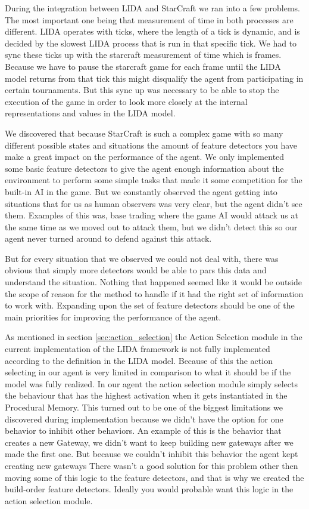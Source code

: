 During the integration between LIDA and StarCraft we ran into a few problems. The most important one being that measurement of time in both processes are different. LIDA operates with ticks, where the length of a tick is dynamic, and is decided by the slowest LIDA process that is run in that specific tick. We had to sync these ticks up with the starcraft measurement  of time which is frames. Because we have to pause the starcraft game for each frame until the LIDA model returns from that tick this might disqualify the agent from participating in certain tournaments. But this sync up was necessary to be able to stop the execution of the game in order to look more closely at the internal representations and values in the LIDA model.

We discovered that because StarCraft is such a complex game with so many different possible states and situations the amount of feature detectors you have make a great impact on the performance of the agent. We only implemented some basic feature detectors to give the agent enough information about the environment to perform some simple tasks that made it some competition for the built-in AI in the game. But we constantly observed the agent getting into situations that for us as human observers was very clear, but the agent didn't see them. Examples of this was, base trading where the game AI would attack us at the same time as we moved out to attack them, but we didn't detect this so our agent never turned around to defend against this attack.

But for every situation that we observed we could not deal with, there was obvious that simply more detectors would be able to pars this data and understand the situation. Nothing that happened seemed like it would be outside the scope of reason for the method to handle if it had the right set of information to work with. Expanding upon the set of feature detectors should be one of the main priorities for improving the performance of the agent.

As mentioned in section \ref{sec:action_selection} the Action Selection module in the current implementation of the LIDA framework is not fully implemented according to the definition in the LIDA model. Because of this the action selecting in our agent is very limited in comparison to what it should be if the model was fully realized. In our agent the action selection module simply selects the behaviour that has the highest activation when it gets instantiated in the Procedural Memory. This turned out to be one of the biggest limitations we discovered during implementation because we didn't have the option for one behavior to inhibit other behaviors. An example of this is the behavior that creates a new Gateway, we didn't want to keep building new gateways after we made the first one. But because we couldn't inhibit this behavior the agent kept creating new gateways There wasn't a good solution for this problem other then moving some of this logic to the feature detectors, and that is why we created the build-order feature detectors. Ideally you would probable want this logic in the action selection module. 

